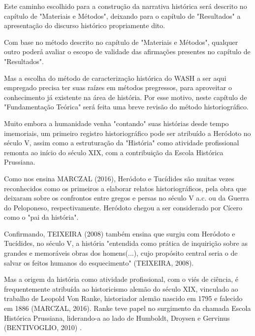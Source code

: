 Este caminho escolhido para a construção da narrativa histórica será descrito no capítulo de "Materiais e Métodos", deixando para o capítulo de "Resultados" a apresentação do discurso histórico propriamente dito.

Com base no método descrito no capítulo de "Materiais e Métodos", qualquer outro poderá avaliar o escopo de validade das afirmações presentes no capítulo de "Resultados".

Mas a escolha do método de caracterização histórica do WASH a ser aqui empregado precisa ter suas raízes em métodos pregressos, para aproveitar o conhecimento já existente na área de história. Por esse motivo, neste capítulo de "Fundamentação Teórica" será feita uma breve revisão do método historiográfico.

Muito embora a humanidade venha "contando" suas histórias desde tempo imemoriais, um primeiro registro historiográfico pode ser atribuído a Heródoto no século V, assim como a estruturação da "História" como atividade profissional remonta ao início do século XIX, com a contribuição da Escola Histórica Prussiana.

Como nos ensina  MARCZAL (2016),  Heródoto e Tucídides são muitas vezes reconhecidos como os primeiros a elaborar relatos historiográficos, pela obra que deixaram sobre os confrontos entre gregos e persas no século V a.c. ou da Guerra do Peloponeso, respectivamente. Heródoto chegou a ser considerado por Cícero como o "pai da história".

Confirmando, TEIXEIRA (2008)  também ensina que surgiu com Heródoto e Tucídides, no século V, a história "entendida como prática de inquirição sobre as grandes e memoráveis obras dos homens(...), cujo propósito central seria o de salvar os feitos humanos do esquecimento"  (TEIXEIRA, 2008).

Mas a origem da história como atividade profissional, com o viés de ciência, é frequentemente atribuída ao historicismo alemão do século XIX, vinculado ao trabalho de Leopold Von Ranke, historiador alemão nascido em 1795 e falecido em 1886 (MARCZAL, 2016). Ranke teve papel no surgimento da chamada Escola Histórica Prussiana, liderando-a ao lado de Humboldt, Droysen e Gervinus  (BENTIVOGLIO, 2010) .



